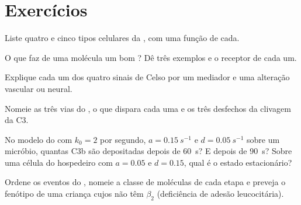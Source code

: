 \section{Exercícios}

\begin{exercise}[$\star$]\label{exo:b3:innate-immunity:1}
Liste quatro  e cinco tipos celulares da , com
uma função de cada.
\end{exercise}

\begin{exercise}[$\star$]\label{exo:b3:innate-immunity:2}
O que faz de uma molécula um bom ? Dê três exemplos e o receptor de cada um.
\end{exercise}

\begin{exercise}[$\star$]\label{exo:b3:innate-immunity:3}
Explique cada um dos quatro sinais de Celso por um mediador e uma
alteração vascular ou neural.
\end{exercise}

\begin{exercise}[$\star$]\label{exo:b3:innate-immunity:4}
Nomeie as três vias do , o que dispara cada uma e os três
desfechos da clivagem da C3.
\end{exercise}

\begin{exercise}[$\star\star$]\label{exo:b3:innate-immunity:5}
No modelo do  com $k_{0} = 2$ por segundo, $a =
\qty{0.15}{s^{-1}}$ e $d = \qty{0.05}{s^{-1}}$ sobre um micróbio,
quantas C3b são depositadas depois de \qty{60}{s}? E depois de
\qty{90}{s}? Sobre uma célula do hospedeiro com $a = 0.05$ e $d = 0.15$,
qual é o estado estacionário?
\end{exercise}

\begin{exercise}[$\star\star$]\label{exo:b3:innate-immunity:6}
Ordene os eventos do , nomeie a classe de moléculas de
cada etapa e preveja o fenótipo de uma criança cujos  não
têm  $\beta_{2}$ (deficiência de adesão leucocitária).
\end{exercise}

